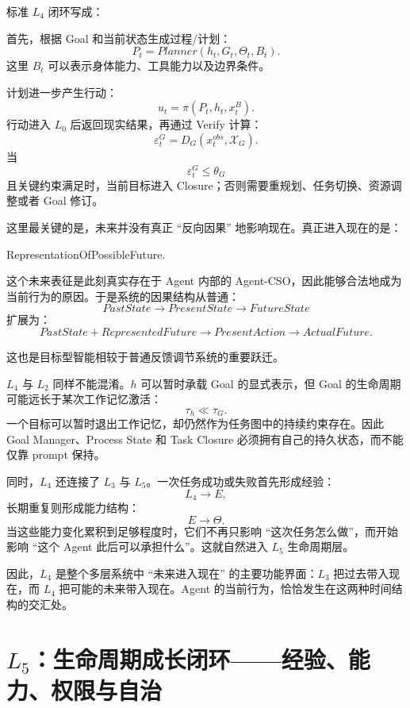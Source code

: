 标准 $L_4$ 闭环写成：
\begin{statementbox}
\centering
{}
\end{statementbox}

首先，根据 Goal 和当前状态生成过程/计划：
\[
P_t
=
Planner
\left(
h_t,
G_t,
\Theta_t,
B_t
\right).
\]
这里 $B_t$ 可以表示身体能力、工具能力以及边界条件。

计划进一步产生行动：
\[
u_t
=
\pi
\left(
P_t,
h_t,
x^B_t
\right).
\]
行动进入 $L_0$ 后返回现实结果，再通过 Verify 计算：
\[
\varepsilon^G_t
=
D_G
\left(
x^{obs}_t,
\mathcal X_G
\right).
\]
当
\[
\varepsilon^G_t
\leq
\theta_G
\]
且关键约束满足时，当前目标进入 Closure；否则需要重规划、任务切换、资源调整或者 Goal 修订。

这里最关键的是，未来并没有真正 ``反向因果'' 地影响现在。真正进入现在的是：
\begin{statementbox}
RepresentationOfPossibleFuture.
\end{statementbox}
这个未来表征是此刻真实存在于 Agent 内部的 Agent-CSO，因此能够合法地成为当前行为的原因。于是系统的因果结构从普通：
\[
PastState\rightarrow PresentState\rightarrow FutureState
\]
扩展为：
\[
PastState
+
RepresentedFuture
\rightarrow
PresentAction
\rightarrow
ActualFuture.
\]

这也是目标型智能相较于普通反馈调节系统的重要跃迁。

$L_4$ 与 $L_2$ 同样不能混淆。$h$ 可以暂时承载 Goal 的显式表示，但 Goal 的生命周期可能远长于某次工作记忆激活：
\[
\tau_h
\ll
\tau_G.
\]
一个目标可以暂时退出工作记忆，却仍然作为任务图中的持续约束存在。因此 Goal Manager、Process State 和 Task Closure 必须拥有自己的持久状态，而不能仅靠 prompt 保持。

同时，$L_4$ 还连接了 $L_3$ 与 $L_5$。一次任务成功或失败首先形成经验：
\[
L_4\rightarrow E,
\]
长期重复则形成能力结构：
\[
E\rightarrow\Theta.
\]
当这些能力变化累积到足够程度时，它们不再只影响 ``这次任务怎么做''，而开始影响 ``这个 Agent 此后可以承担什么''。这就自然进入 $L_5$ 生命周期层。

因此，$L_4$ 是整个多层系统中 ``未来进入现在'' 的主要功能界面：$L_3$ 把过去带入现在，而 $L_4$ 把可能的未来带入现在。Agent 的当前行为，恰恰发生在这两种时间结构的交汇处。

\section{$L_5$：生命周期成长闭环——经验、能力、权限与自治}

